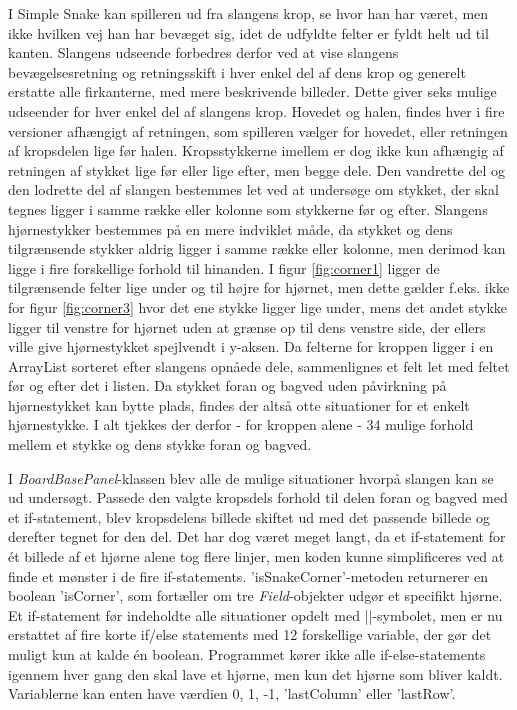 I Simple Snake kan spilleren ud fra slangens krop, se hvor han har været, men ikke hvilken vej han har bevæget sig, idet de udfyldte felter er fyldt helt ud til kanten. Slangens udseende forbedres derfor ved at vise slangens bevægelsesretning og retningsskift i hver enkel del af dens krop og generelt erstatte alle firkanterne, med mere beskrivende billeder. Dette giver seks mulige udseender for hver enkel del af slangens krop. Hovedet og halen, findes hver i fire versioner afhængigt af retningen, som spilleren vælger for hovedet, eller retningen af kropsdelen lige før halen. Kropsstykkerne imellem er dog ikke kun afhængig af retningen af stykket lige før eller lige efter, men begge dele. Den vandrette del og den lodrette del af slangen bestemmes let ved at undersøge om stykket, der skal tegnes ligger i samme række eller kolonne som stykkerne før og efter. Slangens hjørnestykker bestemmes på en mere indviklet måde, da stykket og dens tilgrænsende stykker aldrig ligger i samme række eller kolonne, men derimod kan ligge i fire forskellige forhold til hinanden. I figur \ref{fig:corner1} ligger de tilgrænsende felter lige under og til højre for hjørnet, men dette gælder f.eks. ikke for figur \ref{fig:corner3} hvor det ene stykke ligger lige under, mens det andet stykke ligger til venstre for hjørnet uden at grænse op til dens venstre side, der ellers ville give hjørnestykket spejlvendt i y-aksen. Da felterne for kroppen ligger i en ArrayList sorteret efter slangens opnåede dele, sammenlignes et felt let med feltet før og efter det i listen. Da stykket foran og bagved uden påvirkning på hjørnestykket kan bytte plads, findes der altså otte situationer for et enkelt hjørnestykke. I alt tjekkes der derfor - for kroppen alene - 34 mulige forhold mellem et stykke og dens stykke foran og bagved.
\newline

I \textit{BoardBasePanel}-klassen blev alle de mulige situationer hvorpå slangen kan se ud undersøgt. Passede den valgte kropsdels forhold til delen foran og bagved med et if-statement, blev kropsdelens billede skiftet ud med det passende billede og derefter tegnet for den del. Det har dog været meget langt, da et if-statement for ét billede af et hjørne alene tog flere linjer, men koden kunne simplificeres ved at finde et mønster i de fire if-statements. 
'isSnakeCorner'-metoden returnerer en boolean 'isCorner', som fortæller om tre \textit{Field}-objekter udgør et specifikt hjørne. Et if-statement før indeholdte alle situationer opdelt med ||-symbolet, men er nu erstattet af fire korte if/else statements med 12 forskellige variable, der gør det muligt kun at kalde én boolean. Programmet kører ikke alle if-else-statements igennem hver gang den skal lave et hjørne, men kun det hjørne som bliver kaldt. Variablerne kan enten have værdien 0, 1, -1, 'lastColumn' eller 'lastRow'.
\linebreak

